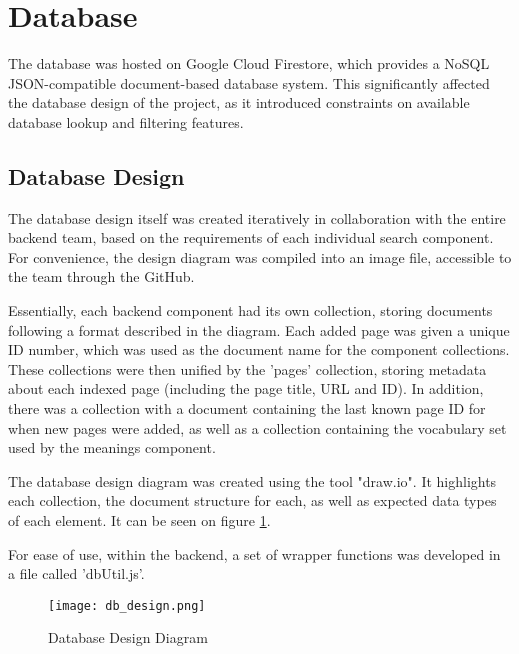 \section{Database}

The database was hosted on Google Cloud Firestore, which provides a NoSQL JSON-compatible document-based database system. This significantly affected the database design of the project, as it introduced constraints on available database lookup and filtering features.

\subsection{Database Design}

The database design itself was created iteratively in collaboration with the entire backend team, based on the requirements of each individual search component. For convenience, the design diagram was compiled into an image file, accessible to the team through the GitHub.

Essentially, each backend component had its own collection, storing documents following a format described in the diagram. Each added page was given a unique ID number, which was used as the document name for the component collections. These collections were then unified by the 'pages' collection, storing metadata about each indexed page (including the page title, URL and ID). In addition, there was a collection with a document containing the last known page ID for when new pages were added, as well as a collection containing the vocabulary set used by the meanings component.

The database design diagram was created using the tool "draw.io". It highlights each collection, the document structure for each, as well as expected data types of each element. It can be seen on figure \ref{fig:db_design}.

For ease of use, within the backend, a set of wrapper functions was developed in a file called 'dbUtil.js'.

\newpage
\begin{figure}[!hb]
    \texttt{[image: db\_design.png]}\\
    \caption{Database Design Diagram}
    \label{fig:db_design}
\end{figure}
\newpage


